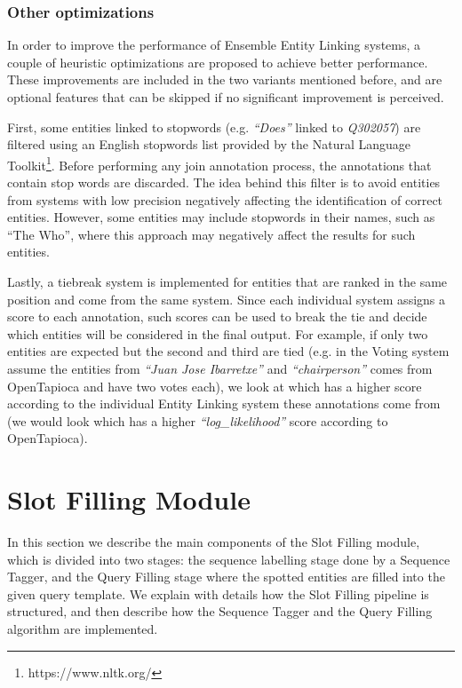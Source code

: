 \subsubsection{Other optimizations}
In order to improve the performance of Ensemble Entity Linking systems, a couple of heuristic 
optimizations are proposed to achieve better performance. These improvements are included in 
the two variants mentioned before, and are optional features that can be skipped if no 
significant improvement is perceived. 

First, some entities linked to stopwords (e.g. \textit{“Does”} linked to \textit{Q302057}) are 
filtered using an English stopwords list provided by the Natural Language Toolkit\footnote{https://www.nltk.org/}. 
Before performing any join annotation process, the annotations that contain stop words are 
discarded. The idea behind this filter is to avoid entities from systems with low precision 
negatively affecting the identification of correct entities. However, some entities may 
include stopwords in their names, such as “The Who”, where this approach may negatively 
affect the results for such entities.

Lastly, a tiebreak system is implemented for entities that are ranked in the same position 
and come from the same system. Since each individual system assigns a score to each annotation, 
such scores can be used to break the tie and decide which entities will be considered in the 
final output. For example, if only two entities are expected but the second and third are 
tied (e.g. in the Voting system assume the entities from \textit{“Juan Jose Ibarretxe”} and 
\textit{“chairperson”} comes from OpenTapioca and have two votes each), we look at which has 
a higher score according to the individual Entity Linking system these annotations come from 
(we would look which has a higher \textit{“log\_likelihood”} score according to OpenTapioca). 

\section{Slot Filling Module}
In this section we describe the main components of the Slot Filling module, which is divided 
into two stages: the sequence labelling stage done by a Sequence Tagger, and the Query 
Filling stage where the spotted entities are filled into the given query template. We explain 
with details how the Slot Filling pipeline is structured, and then describe how the Sequence 
Tagger and the Query Filling algorithm are implemented.

